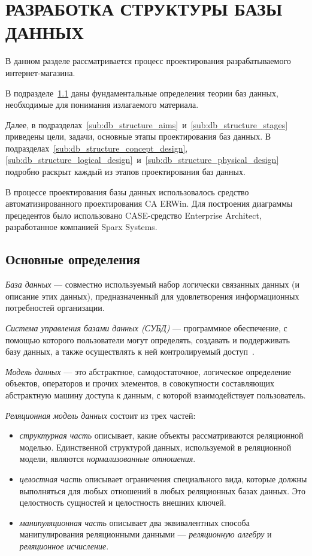 \section[Разработка структуры БД]{РАЗРАБОТКА СТРУКТУРЫ БАЗЫ ДАННЫХ}
\label{sect:db_structure}

В данном разделе рассматривается процесс проектирования разрабатываемого
интернет-магазина.

В подразделе~\ref{sub:db_structure_theory} даны фундаментальные определения теории
баз данных, необходимые для понимания излагаемого материала.

Далее, в подразделах~\ref{sub:db_structure_aims}~и~\ref{sub:db_structure_stages}
приведены цели, задачи, основные этапы проектирования баз данных.
В подразделах~\ref{sub:db_structure_concept_design},
\ref{sub:db_structure_logical_design}~и~\ref{sub:db_structure_physical_design}
подробно раскрыт каждый из этапов проектирования баз данных.

В процессе проектирования базы данных использовалось средство автоматизированного
проектирования CA ERWin.
Для построения диаграммы прецедентов было использовано CASE-средство
Enterprise Architect, разработанное компанией Sparx Systems.

\subsection{Основные определения}
\label{sub:db_structure_theory}

\textit{База данных} --- совместно используемый набор логически связанных данных
(и описание этих данных), предназначенный для удовлетворения информационных
потребностей организации.

\textit{Система управления базами данных (СУБД)} --- программное обеспечение,
с помощью которого пользователи могут определять, создавать и поддерживать базу данных,
а также осуществлять к ней контролируемый доступ~\cite{konnolli03}.

\textit{Модель данных} --- это абстрактное, самодостаточное,
логическое определение объектов, операторов и прочих элементов,
в совокупности составляющих абстрактную  машину доступа к данным,
с которой взаимодействует пользователь.

\textit{Реляционная модель данных} состоит из трех частей:
\begin{itemize}
\item
  \textit{структурная часть} описывает, какие объекты рассматриваются
  реляционной моделью. Единственной структурой данных, используемой
  в реляционной модели, являются \textit{нормализованные отношения}.
\item
  \textit{целостная часть} описывает ограничения специального вида,
  которые должны выполняться для любых отношений в любых реляционных базах данных.
  Это целостность сущностей и целостность внешних ключей.
\item
  \textit{манипуляционная часть} описывает два эквивалентных способа
  манипулирования реляционными данными --- \textit{реляционную алгебру} и
  \textit{реляционное исчисление}.
\end{itemize}

